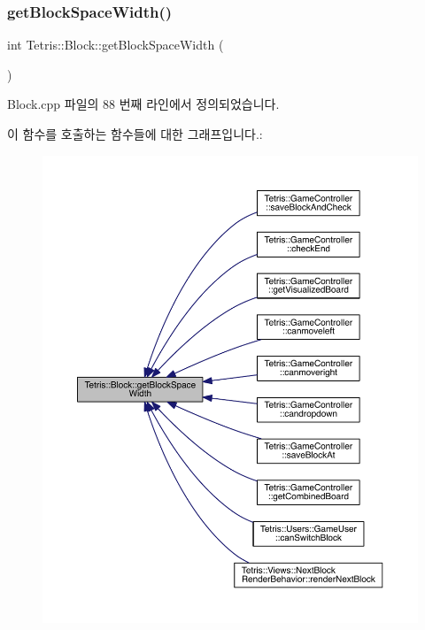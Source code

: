 \subsubsection{\texorpdfstring{get\+Block\+Space\+Width()}{getBlockSpaceWidth()}\hspace{0.1cm}{\footnotesize\ttfamily [1/2]}}
{\footnotesize\ttfamily int Tetris\+::\+Block\+::get\+Block\+Space\+Width (\begin{DoxyParamCaption}{ }\end{DoxyParamCaption})}



Block.\+cpp 파일의 88 번째 라인에서 정의되었습니다.

이 함수를 호출하는 함수들에 대한 그래프입니다.\+:
\nopagebreak
\begin{figure}[H]
\begin{center}
\leavevmode
\includegraphics[width=350pt]{class_tetris_1_1_block_ac390e14de476582300d815d9054ed9bd_icgraph}
\end{center}
\end{figure}
\mbox{\label{class_tetris_1_1_block_ac390e14de476582300d815d9054ed9bd}} 
